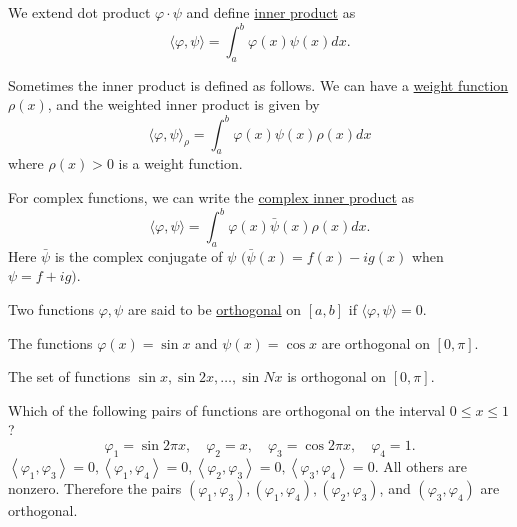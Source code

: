 \begin{definition} We extend dot product $\varphi \cdot \psi$ and define \underline{inner product} as
\begin{equation}\label{eq.inner_product}
    \langle\varphi, \psi\rangle=\int_a^b \varphi(x) \psi(x) d x .
\end{equation}
    
Sometimes the inner product is defined as follows. We can have a \underline{weight function} $\rho(x)$, and the weighted inner product is given by
\begin{equation}\label{eq.inner_product_weight}
    \langle\varphi, \psi\rangle_\rho=\int_a^b \varphi(x) \psi(x) \rho(x) d x
\end{equation}
where $\rho(x)>0$ is a weight function. 

For complex functions, we can write the \underline{complex inner product} as
\begin{equation}\label{eq.inner_product_complex}
    \langle\varphi, \psi\rangle=\int_a^b \varphi(x) \bar{\psi}(x) \rho(x) d x .
\end{equation}
Here $\bar{\psi}$ is the complex conjugate of $\psi$ $(\bar{\psi}(x)=f(x)-i g(x)$ when $\psi=f+i g)$.
    
\end{definition}

\begin{definition}[Orthogonality]
Two functions $\varphi, \psi$ are said to be \underline{orthogonal} on $[a, b]$ if $\langle\varphi, \psi\rangle=0$.    
\end{definition}

\begin{example}[]
    The functions $\varphi(x)=\sin x$ and $\psi(x)=\cos x$ are orthogonal on $[0, \pi]$.
\end{example}
\begin{example}[]
    The set of functions $\sin x, \sin 2 x, \ldots, \sin N x$ is orthogonal on $[0, \pi]$.
\end{example}
\begin{example}[]
    Which of the following pairs of functions are orthogonal on the interval $0 \leq x \leq 1$?
$$
\varphi_1=\sin 2 \pi x, \quad \varphi_2=x, \quad \varphi_3=\cos 2 \pi x, \quad \varphi_4=1 .
$$
$\left\langle\varphi_1, \varphi_3\right\rangle=0,\left\langle\varphi_1, \varphi_4\right\rangle=0,\left\langle\varphi_2, \varphi_3\right\rangle=0,\left\langle\varphi_3, \varphi_4\right\rangle=0$. All others are nonzero. Therefore the pairs $\left(\varphi_1, \varphi_3\right),\left(\varphi_1, \varphi_4\right),\left(\varphi_2, \varphi_3\right)$, and $\left(\varphi_3, \varphi_4\right)$ are orthogonal.
\end{example}

